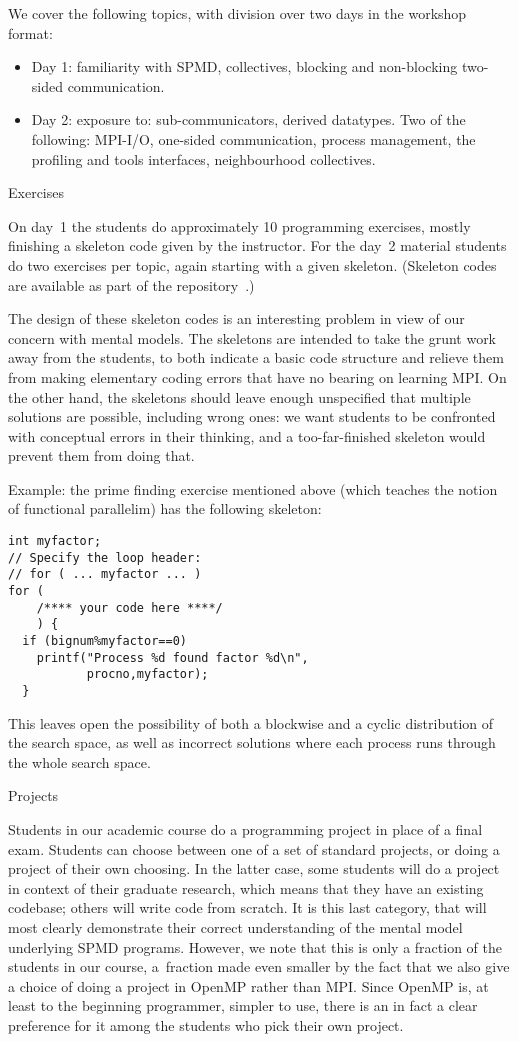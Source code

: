 We cover the following topics, with division over two days in the
workshop format:
\begin{itemize}
\item Day 1: familiarity with SPMD, collectives, blocking and
  non-blocking two-sided communication.
\item Day 2: exposure to: sub-communicators, derived datatypes.
  Two of the following: MPI-I/O, one-sided communication, process
  management, the profiling and tools interfaces, neighbourhood collectives.
\end{itemize}

 {Exercises}

On day~1 the students do approximately 10 programming exercises,
mostly finishing a skeleton code given by the instructor.
For the day~2 material students do two exercises per topic, again
starting with a given skeleton. (Skeleton codes are available as part
of the repository~\cite{Eijkhout:MPI}.)

The design of these skeleton codes is an interesting problem in view
of our concern with mental models. The
skeletons are intended to take the grunt work away from the students,
to both indicate a basic code structure and relieve them from making
elementary coding errors that have no bearing on learning MPI. On the
other hand, the skeletons should leave enough unspecified that
multiple solutions are possible, including wrong ones: we want
students to be confronted with conceptual errors in their thinking,
and a too-far-finished skeleton would prevent them from doing that.

Example: the prime finding exercise mentioned above (which teaches the
notion of functional parallelim) has the following skeleton:
{\small
\begin{verbatim}
int myfactor;
// Specify the loop header:
// for ( ... myfactor ... )
for (
    /**** your code here ****/
    ) {
  if (bignum%myfactor==0)
    printf("Process %d found factor %d\n",
           procno,myfactor);
  }
\end{verbatim}
}
%
This leaves open the possibility of both a blockwise and a cyclic
distribution of the search space, as well as incorrect solutions where
each process runs through the whole search space.

 {Projects}

Students in our academic course do a programming project in place of a
final exam. Students can choose between one of a set of standard
projects, or doing a project of their own choosing. In the latter
case, some students will do a project in context of their graduate
research, which means that they have an existing codebase; others will
write code from scratch. It is this last category, that will most
clearly demonstrate their correct understanding of the mental model
underlying \ac{SPMD} programs. However, we note that this is only a
fraction of the students in our course, a~fraction made even smaller
by the fact that we also give a choice of doing a project in OpenMP
rather than MPI. Since OpenMP is, at least to the beginning
programmer, simpler to use, there is an in fact a clear preference for it
among the students who pick their own project.

